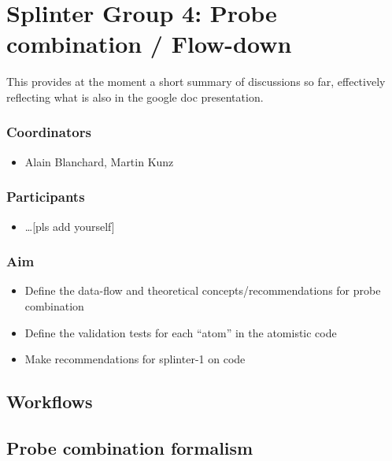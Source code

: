 \section{Splinter Group 4: Probe combination / Flow-down}

This provides at the moment a short summary of discussions so far, effectively
reflecting what is also in the google doc presentation.

\subsubsection*{Coordinators}
\begin{itemize}
 \item Alain Blanchard, Martin Kunz
\end{itemize}
\subsubsection*{Participants}
\begin{itemize}
 \item \ldots [pls add yourself]
\end{itemize}

\subsubsection*{Aim}

\begin{itemize}
\item Define the data-flow and theoretical concepts/recommendations for probe combination
\item Define the validation tests for each “atom” in the atomistic code
\item Make recommendations for splinter-1 on code 
\end{itemize}



\subsection{Workflows}


\subsection{Probe combination formalism}


